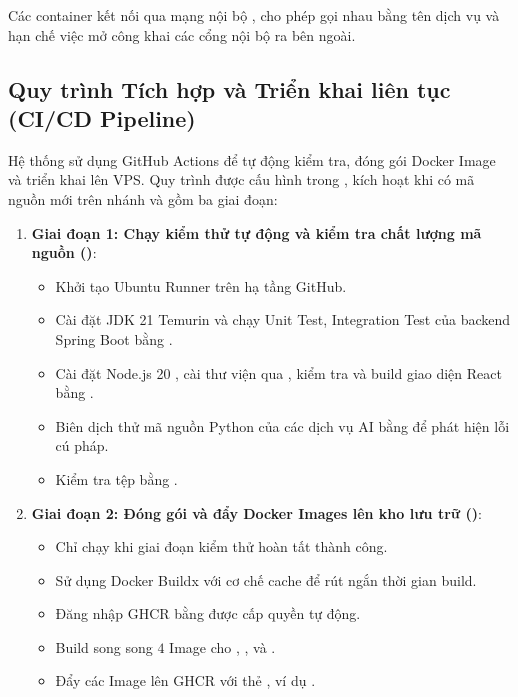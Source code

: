 \documentclass[../DoAn.tex]{subfiles}
\begin{document}
Các container kết nối qua mạng nội bộ , cho phép gọi nhau bằng tên dịch vụ và hạn chế việc mở công khai các cổng nội bộ ra bên ngoài.

\subsection{Quy trình Tích hợp và Triển khai liên tục (CI/CD Pipeline)}
\label{subsection:4.5.3}

Hệ thống sử dụng GitHub Actions để tự động kiểm tra, đóng gói Docker Image và triển khai lên VPS. Quy trình được cấu hình trong , kích hoạt khi có mã nguồn mới trên nhánh  và gồm ba giai đoạn:

\begin{enumerate}
    \item \textbf{Giai đoạn 1: Chạy kiểm thử tự động và kiểm tra chất lượng mã nguồn ()}:
    \begin{itemize}
        \item Khởi tạo Ubuntu Runner trên hạ tầng GitHub.
        \item Cài đặt JDK 21 Temurin \cite{openjdk_docs} và chạy Unit Test, Integration Test của backend Spring Boot bằng  .
        \item Cài đặt Node.js 20 \cite{nodejs_docs}, cài thư viện qua  , kiểm tra    và build giao diện React bằng   .
        \item Biên dịch thử mã nguồn Python của các dịch vụ AI bằng    để phát hiện lỗi cú pháp.
        \item Kiểm tra tệp  bằng   .
    \end{itemize}
    
    \item \textbf{Giai đoạn 2: Đóng gói và đẩy Docker Images lên kho lưu trữ ()}:
    \begin{itemize}
        \item Chỉ chạy khi giai đoạn kiểm thử hoàn tất thành công.
        \item Sử dụng Docker Buildx với cơ chế cache để rút ngắn thời gian build.
        \item Đăng nhập GHCR bằng  được cấp quyền tự động.
        \item Build song song $4$ Image cho , ,  và .
        \item Đẩy các Image lên GHCR với thẻ , ví dụ .
    \end{itemize}


\end{enumerate}
\end{document}
